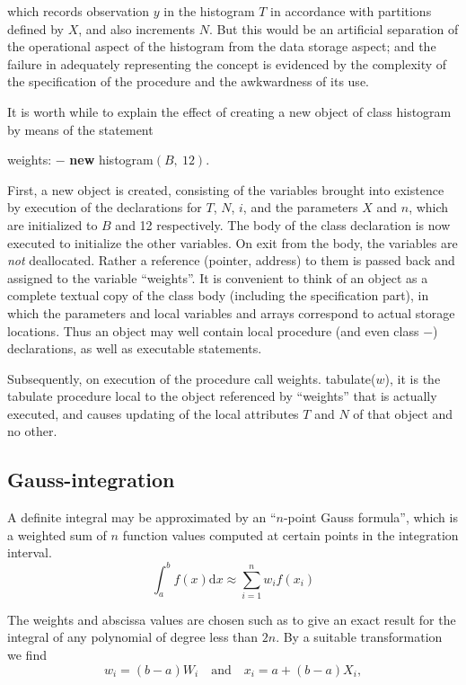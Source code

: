 \noindent
which records observation $y$ in the histogram $T$ in accordance with partitions defined by $X$, and also increments $N$. But this would be an artificial separation
of the operational aspect of the histogram from the data storage aspect; and the failure in adequately representing the concept is evidenced by the complexity of the specification of the procedure and the awkwardness of its use. 

It is worth while to explain the effect of creating a new object of class histogram by means of the statement

\quad weights: $-$ \textbf{new} histogram$(B,\ 12)$.

\noindent
First, a new object is created, consisting of the variables brought into existence by execution of the declarations for $T$, $N$, $i$, and the parameters $X$ and $n$, which are initialized to $B$ and 12 respectively. The body of the class declaration is now executed to initialize the other variables. On exit from the body, the variables are \textit{not} deallocated. Rather a reference (pointer, address) to them is passed back and assigned to the variable ``weights''. It is convenient to think of an object as a complete textual copy of the class body (including the specification part), in which the parameters and local variables and arrays correspond to actual storage locations. Thus an object may well contain local procedure (and even class $-$) declarations, as well as executable statements.

Subsequently, on execution of the procedure call weights. tabulate($w$), it is the tabulate procedure local to the object referenced by ``weights'' that is actually executed, and causes updating of the local attributes $T$ and $N$ of that object and no other.

\subsection{Gauss-integration}

A definite integral may be approximated by an ``$n$-point Gauss formula'', which is a weighted sum of $n$ function values computed at certain points in the integration interval.
$$
\int_a^b f(x)\text{d}x \approx \sum_{i = 1}^n w_i f(x_i)
$$

\noindent
The weights and abscissa values are chosen such as to give an exact result for the integral of any polynomial of degree less than $2n$. By a suitable transformation we find
$$
w_i = (b - a)W_i \quad\text{and}\quad x_i = a + (b - a)X_i,
$$

